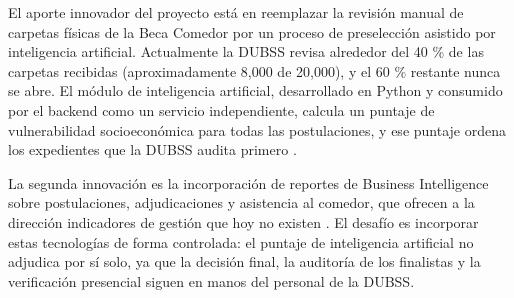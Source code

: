 El aporte innovador del proyecto está en reemplazar la revisión manual de carpetas físicas de la Beca Comedor por un proceso de preselección asistido por inteligencia artificial. Actualmente la DUBSS revisa alrededor del 40 \% de las carpetas recibidas (aproximadamente 8,000 de 20,000), y el 60 \% restante nunca se abre. El módulo de inteligencia artificial, desarrollado en Python y consumido por el backend como un servicio independiente, calcula un puntaje de vulnerabilidad socioeconómica para todas las postulaciones, y ese puntaje ordena los expedientes que la DUBSS audita primero \parencite{russellnorvig2021ia}.

La segunda innovación es la incorporación de reportes de Business Intelligence sobre postulaciones, adjudicaciones y asistencia al comedor, que ofrecen a la dirección indicadores de gestión que hoy no existen \parencite{golfarelli2009dw, few2006dashboard}. El desafío es incorporar estas tecnologías de forma controlada: el puntaje de inteligencia artificial no adjudica por sí solo, ya que la decisión final, la auditoría de los finalistas y la verificación presencial siguen en manos del personal de la DUBSS.
